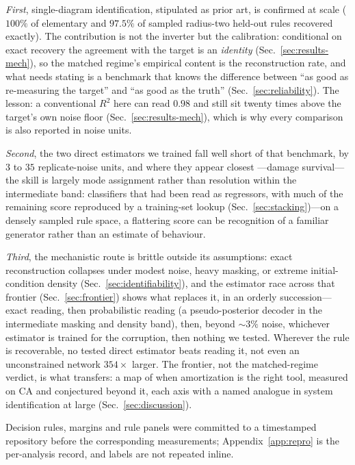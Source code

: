 \documentclass[aip,cha,amsmath,amssymb,reprint,floatfix]{revtex4-2}
\newcommand{\rtwo}{$R^2$}
\begin{document}
\emph{First}, single-diagram identification, stipulated as prior art, is
confirmed at scale ($100\%$ of elementary and $97.5\%$ of sampled radius-two
held-out rules recovered exactly). The contribution is not the inverter but
the calibration: conditional on exact recovery the agreement with the target
is an \emph{identity} (Sec.~\ref{sec:results-mech}), so the matched regime's
empirical content is the reconstruction rate, and what needs stating is a
benchmark that knows the difference between ``as good as re-measuring the
target'' and ``as good as the truth'' (Sec.~\ref{sec:reliability}). The
lesson: a conventional \rtwo{} here can read $0.98$ and still sit twenty
times above the target's own noise floor (Sec.~\ref{sec:results-mech}),
which is why every comparison is also reported in noise units.

\emph{Second}, the two direct estimators we trained fall well short of that
benchmark, by $3$ to $35$ replicate-noise units, and where they appear closest
---damage survival---the skill is largely mode assignment rather than
resolution within the intermediate band: classifiers that had been read as
regressors, with much of the remaining score reproduced by a training-set
lookup (Sec.~\ref{sec:stacking})---on a densely sampled rule space, a
flattering score can be recognition of a familiar generator rather than an
estimate of behaviour.

\emph{Third}, the mechanistic route
is brittle outside its assumptions: exact reconstruction collapses under
modest noise, heavy masking, or extreme initial-condition density
(Sec.~\ref{sec:identifiability}), and the estimator race across that frontier
(Sec.~\ref{sec:frontier}) shows what replaces it, in an orderly
succession---exact reading, then probabilistic reading (a pseudo-posterior
decoder in the intermediate masking and density band), then, beyond
${\sim}3\%$ noise, whichever estimator is trained for the corruption, then
nothing we tested. Wherever the rule is
recoverable, no tested direct estimator beats reading it, not even an
unconstrained network $354\times$ larger. The frontier, not the
matched-regime verdict, is what transfers: a map of when amortization is
the right tool, measured on CA and conjectured beyond it, each axis with a
named analogue in system identification at large
(Sec.~\ref{sec:discussion}).

Decision rules, margins and rule panels were committed to a timestamped
repository before the corresponding measurements; Appendix~\ref{app:repro} is
the per-analysis record, and labels are not repeated inline.
\end{document}
